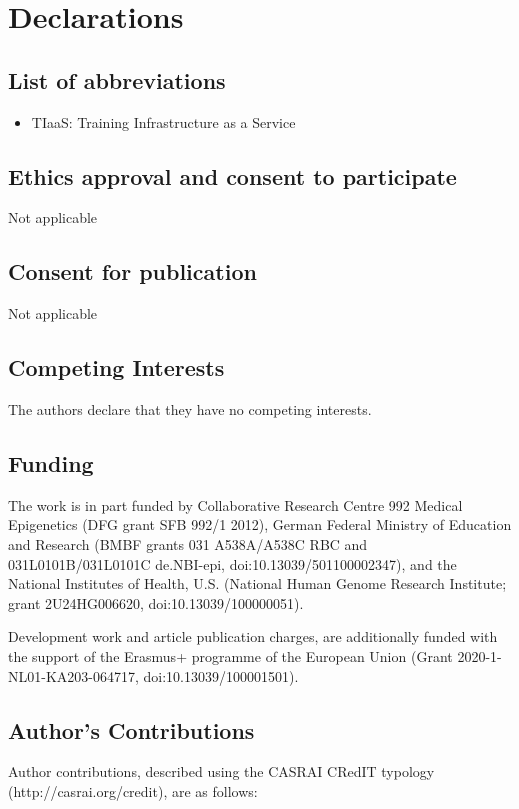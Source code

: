 \documentclass[a4paper,num-refs]{oup-contemporary}
\begin{document}
\section{Declarations}

\subsection{List of abbreviations}
\begin{itemize}
\item TIaaS: Training Infrastructure as a Service
\end{itemize}

\subsection{Ethics approval and consent to participate}
Not applicable

\subsection{Consent for publication}
Not applicable

\subsection{Competing Interests}
The authors declare that they have no competing interests.

\subsection{Funding}
The work is in part funded by Collaborative Research Centre 992 Medical Epigenetics (DFG grant SFB 992/1 2012), German Federal Ministry of Education and Research (BMBF grants 031 A538A/A538C RBC and 031L0101B/031L0101C de.NBI-epi, doi:10.13039/501100002347), and the National Institutes of Health, U.S. (National Human Genome Research Institute; grant 2U24HG006620, doi:10.13039/100000051).

Development work and article publication charges, are additionally funded with the support of the Erasmus+ programme of the European Union (Grant 2020-1-NL01-KA203-064717, doi:10.13039/100001501).

\subsection{Author's Contributions}
Author contributions, described using the CASRAI CRedIT typology (http://casrai.org/credit), are as follows:
\end{document}
